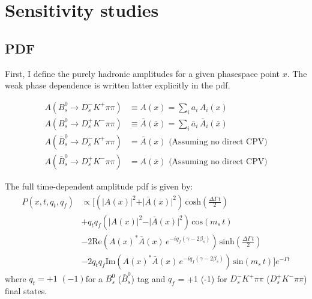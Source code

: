 
\section{Sensitivity studies}


\subsection{PDF}

First, I define the purely hadronic amplitudes for a given phasespace point $x$.
The weak phase dependence is written latter explicitly in the pdf.


\begin{align}
	A(B_s^0 \to D_s^{-} K^{+} \pi\pi) &\equiv A(x) = \sum_i a_i \, A_i(x)   \\
	A(B_s^0 \to D_s^{+} K^{-} \pi\pi) &\equiv \bar A(\bar x) = \sum_i \bar a_i \,\bar A_i(\bar x)    \\
	A(\bar B_s^0 \to D_s^{-} K^{+} \pi\pi) &= \bar A(x)  \, \, \text{(Assuming no direct CPV)} \\
	A(\bar B_s^0 \to D_s^{+} K^{-} \pi\pi) &= A(\bar x)  \, \, \text{(Assuming no direct CPV)} 
\end{align}

The full time-dependent amplitude pdf is given by:
\begin{equation}
\begin{split}
\label{eq:PDF_full}
	P(x,t,q_t,q_f) &\propto  [
	 \left( \vert A(x) \vert^2 + \vert \bar A(x) \vert^2 \right) \, \text{cosh} \left( \frac{\Delta \Gamma \, t}{2}\right) \\
	 & + q_t q_f \left( \vert A(x) \vert^2 - \vert \bar A(x) \vert^2 \right) \, \text{cos} \left( m_s \, t \right)  \\
	 & -2 \text{Re}\left( A(x)^{*}  \bar A(x) \, e^{-i q_f (\gamma - 2\beta_s)}  \right) \, \text{sinh} \left( \frac{\Delta \Gamma \, t}{2}\right)  \\
	 & -2 q_t q_f \text{Im}\left( A(x)^{*}  \bar A(x) \, e^{-i q_f (\gamma - 2\beta_s)}  \right)\, \text{sin} \left( m_s \, t \right)  ]  e^{- \Gamma t}
\end{split}
\end{equation}
where $q_t = +1$ $(-1) $for a $B_s^{0}$ ($\bar B_s^{0}$) tag and 
$q_f$ = +1 $ $(-1) for $D_s^{-} K^{+} \pi\pi$ ($D_s^{+} K^{-} \pi\pi$) final states. \\

